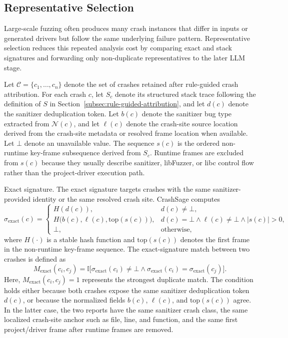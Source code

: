 \documentclass[pdflatex,sn-basic]{sn-jnl}%
\theoremstyle{thmstyleone}%
\theoremstyle{thmstyletwo}%
\theoremstyle{thmstylethree}%
\begin{document}
\subsection{Representative Selection}
\label{subsec:representative-selection}

Large-scale fuzzing often produces many crash instances that differ in inputs or generated drivers but follow the same underlying failure pattern.
Representative selection reduces this repeated analysis cost by comparing exact and stack signatures and forwarding only non-duplicate representatives to the later LLM stage.

Let \(\mathcal{C}=\{c_1,\ldots,c_n\}\) denote the set of crashes retained after rule-guided crash attribution.
For each crash \(c\), let \(S_c\) denote its structured stack trace following the definition of \(S\) in Section~\ref{subsec:rule-guided-attribution}, and let \(d(c)\) denote the sanitizer deduplication token.
Let \(b(c)\) denote the sanitizer bug type extracted from \(\mathcal{N}(c)\), and let \(\ell(c)\) denote the crash-site source location derived from the crash-site metadata or resolved frame location when available.
Let \(\bot\) denote an unavailable value.
The sequence \(s(c)\) is the ordered non-runtime key-frame subsequence derived from \(S_c\).
Runtime frames are excluded from \(s(c)\) because they usually describe sanitizer, libFuzzer, or libc control flow rather than the project-driver execution path.

Exact signature. The exact signature targets crashes with the same sanitizer-provided identity or the same resolved crash site.
CrashSage computes
\begin{equation*}
\sigma_{\mathrm{exact}}(c)=
\begin{cases}
H(d(c)), & d(c)\neq \bot,\\
H\bigl(b(c),\ell(c),\mathrm{top}(s(c))\bigr), & d(c)=\bot \land \ell(c)\neq \bot \land |s(c)|>0,\\
\bot, & \text{otherwise},
\end{cases}
\end{equation*}
where \(H(\cdot)\) is a stable hash function and \(\mathrm{top}(s(c))\) denotes the first frame in the non-runtime key-frame sequence.
The exact-signature match between two crashes is defined as
\begin{equation*}
M_{\mathrm{exact}}(c_i,c_j)=
\mathbb{I}\bigl[
\sigma_{\mathrm{exact}}(c_i)\neq \bot
\land \sigma_{\mathrm{exact}}(c_i)=\sigma_{\mathrm{exact}}(c_j)
\bigr].
\end{equation*}
Here, \(M_{\mathrm{exact}}(c_i,c_j)=1\) represents the strongest duplicate match.
The condition holds either because both crashes expose the same sanitizer deduplication token \(d(c)\), or because the normalized fields \(b(c)\), \(\ell(c)\), and \(\mathrm{top}(s(c))\) agree.
In the latter case, the two reports have the same sanitizer crash class, the same localized crash-site anchor such as file, line, and function, and the same first project/driver frame after runtime frames are removed.
\end{document}
